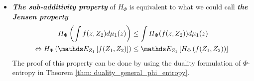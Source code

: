 \documentclass[11pt]{article}
\begin{document}
\begin{itemize}
%

\item \begin{remark}
\emph{\textbf{The sub-additivity property}} of $H_{\Phi}$ is equivalent to what we could call \emph{\textbf{the Jensen property}}
\begin{align}
H_{\Phi}\paren{\int f(z, Z_2)d\mu_1(z)} &\le \int H_{\Phi}(f(z, Z_2)) d\mu_1(z) \nonumber\\
\Leftrightarrow H_{\Phi}\paren{\E{Z_1}{f(Z_1, Z_2)}} &\le \E{Z_1}{H_{\Phi}\paren{f(Z_1, Z_2)}} \label{eqn: sub_additivity_phi_entropy_general_proof_1}
\end{align}
The proof of this property can be done by using the duality formulation of $\Phi$-entropy in Theorem \ref{thm: duality_general_phi_entropy}.
\end{remark}
\end{itemize}
\end{document}
